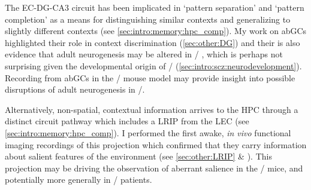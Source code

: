 The EC-DG-CA3 circuit has been implicated in `pattern separation' and `pattern completion'  as a means for distinguishing similar contexts and generalizing to slightly different contexts (see \autoref{sec:intro:memory:hpc_comp}).
My work on \acp{abGC} highlighted their role in context discrimination (\autoref{sec:other:DG}) and their is also evidence that adult neurogenesis may be altered in \scz/ \citep[reviewed in,][]{Toro2007}, which is perhaps not surprising given the developmental origin of \scz/ (\autoref{sec:intro:scz:neurodevelopment}).
Recording from \acp{abGC} in the \df/ mouse model may provide insight into possible disruptions of adult neurogenesis in \scz/.

Alternatively, non-spatial, contextual information arrives to the \ac{HPC} through a distinct circuit pathway which includes a \ac{LRIP} from the \ac{LEC} (see \autoref{sec:intro:memory:hpc_comp}).
I performed the first awake, \emph{in vivo} functional imaging recordings of this projection which confirmed that they carry information about salient features of the environment (see \autoref{sec:other:LRIP} \& \citet{Basu2016}).
This projection may be driving the observation of aberrant salience in the \df/ mice, and potentially more generally in \scz/ patients.

